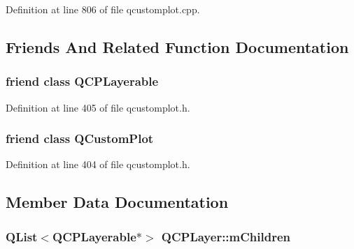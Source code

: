 Definition at line 806 of file qcustomplot.\-cpp.



\subsection{Friends And Related Function Documentation}
\hypertarget{class_q_c_p_layer_ad655f55cccf49ba14d5172ec517e07ae}{
\subsubsection[{Q\-C\-P\-Layerable}]{\setlength{\rightskip}{0pt plus 5cm}friend class {\bf Q\-C\-P\-Layerable}\hspace{0.3cm}{\ttfamily [friend]}}}\label{class_q_c_p_layer_ad655f55cccf49ba14d5172ec517e07ae}


Definition at line 405 of file qcustomplot.\-h.

\hypertarget{class_q_c_p_layer_a1cdf9df76adcfae45261690aa0ca2198}{
\subsubsection[{Q\-Custom\-Plot}]{\setlength{\rightskip}{0pt plus 5cm}friend class {\bf Q\-Custom\-Plot}\hspace{0.3cm}{\ttfamily [friend]}}}\label{class_q_c_p_layer_a1cdf9df76adcfae45261690aa0ca2198}


Definition at line 404 of file qcustomplot.\-h.



\subsection{Member Data Documentation}
\hypertarget{class_q_c_p_layer_a704aa71bba469383c3a3c598c1ec0d28}{
\subsubsection[{m\-Children}]{\setlength{\rightskip}{0pt plus 5cm}Q\-List$<${\bf Q\-C\-P\-Layerable}$\ast$$>$ Q\-C\-P\-Layer\-::m\-Children\hspace{0.3cm}{\ttfamily [protected]}}}\label{class_q_c_p_layer_a704aa71bba469383c3a3c598c1ec0d28}


